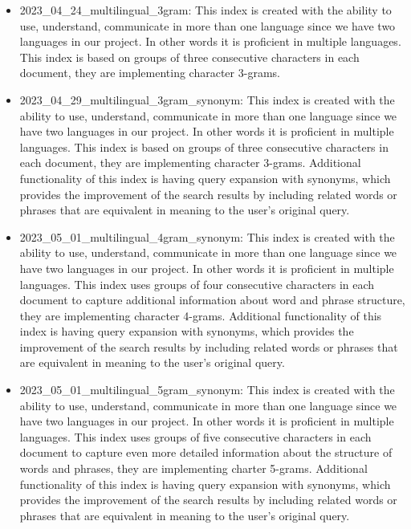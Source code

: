 \begin{itemize}
	\item 2023\_04\_24\_multilingual\_3gram: This index is created with the ability to use, understand, communicate in more than one language since we have two languages in our project. In other words it is proficient in multiple languages. This index is based on groups of three consecutive characters in each document, they are implementing character 3-grams.
	
 \item 2023\_04\_29\_multilingual\_3gram\_synonym: This index is created with the ability to use, understand, communicate in more than one language since we have two languages in our project. In other words it is proficient in multiple languages.  This index is based on groups of three consecutive characters in each document, they are implementing character 3-grams. Additional functionality of this index is having query expansion with synonyms, which provides the improvement of the search results by including related words or phrases that are equivalent in meaning to the user's original query.
	\item 2023\_05\_01\_multilingual\_4gram\_synonym: This index is created with the ability to use, understand, communicate in more than one language since we have two languages in our project. In other words it is proficient in multiple languages. This index uses groups of four consecutive characters in each document to capture additional information about word and phrase structure, they are implementing character 4-grams. Additional functionality of this index is having query expansion with synonyms, which provides the improvement of the search results by including related words or phrases that are equivalent in meaning to the user's original query.
	\item 2023\_05\_01\_multilingual\_5gram\_synonym: This index is created with the ability to use, understand, communicate in more than one language since we have two languages in our project. In other words it is proficient in multiple languages. This index uses groups of five consecutive characters in each document to capture even more detailed information about the structure of words and phrases, they are implementing charter 5-grams.  Additional functionality of this index is having query expansion with synonyms, which provides the improvement of the search results by including related words or phrases that are equivalent in meaning to the user's original query.

\end{itemize}
